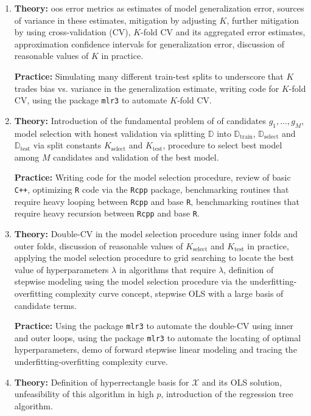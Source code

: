 \documentclass[12pt]{article}
\begin{document}
\begin{enumerate}[(1)]
\item \textbf{Theory:} oos error metrics as estimates of model generalization error, sources of variance in these estimates, mitigation by adjusting $K$, further mitigation by using cross-validation (CV), $K$-fold CV and its aggregated error estimates, approximation confidence intervals for generalization error, discussion of reasonable values of $K$ in practice.

\textbf{Practice:} Simulating many different train-test splits to underscore that $K$ trades bias vs. variance in the generalization estimate, writing code for $K$-fold CV, using the package \texttt{mlr3} to automate $K$-fold CV.

\item \textbf{Theory:} Introduction of the fundamental problem of  of candidates $g_1, \ldots, g_M$, model selection with honest validation via splitting $\mathbb{D}$ into $\mathbb{D}_{\text{train}}$, $\mathbb{D}_{\text{select}}$ and $\mathbb{D}_{\text{test}}$ via split constants $K_{\text{select}}$ and $K_{\text{test}}$, procedure to select best model among $M$ candidates and validation of the best model.

\textbf{Practice:} Writing code for the model selection procedure, review of basic \texttt{C++}, optimizing \texttt{R} code via the \texttt{Rcpp} package, benchmarking routines that require heavy looping between \texttt{Rcpp} and base \texttt{R}, benchmarking routines that require heavy recursion between \texttt{Rcpp} and base \texttt{R}.

\item \textbf{Theory:} Double-CV in the model selection procedure using inner folds and outer folds, discussion of reasonable values of $K_{\text{select}}$ and $K_{\text{test}}$ in practice, applying the model selection procedure to grid searching to locate the best value of hyperparameters $\lambda$ in algorithms that require $\lambda$, definition of stepwise modeling using the model selection procedure via the underfitting-overfitting complexity curve concept, stepwise OLS with a large basis of candidate terms. 

\textbf{Practice:} Using the package \texttt{mlr3} to automate the double-CV using inner and outer loops, using the package \texttt{mlr3} to automate the locating of optimal hyperparameters, demo of forward stepwise linear modeling and tracing the underfitting-overfitting complexity curve.

\item \textbf{Theory:} Definition of hyperrectangle basis for $\mathcal{X}$ and its OLS solution, unfeasibility of this algorithm in high $p$, introduction of the regression tree algorithm.


\end{enumerate}
\end{document}
